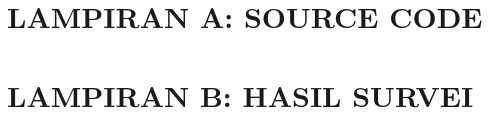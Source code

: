 \documentclass[12pt,a4paper,oneside]{book}
\begin{document}
\backmatter

\printbibliography[title={DAFTAR PUSTAKA}]

\appendix

\chapter{LAMPIRAN A: SOURCE CODE}

\chapter{LAMPIRAN B: HASIL SURVEI}
\end{document}

